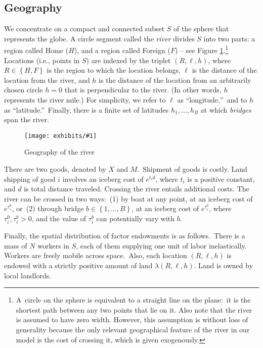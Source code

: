\documentclass[12pt]{article}
\newcommand{\dofigure}[2]{\begin{figure}[h!]
\center %
\texttt{[image: exhibits/\#1]}
\caption{#2\label{fig:#1}}
\end{figure}}
\begin{document}
\subsection{Geography}

We concentrate on a compact and connected subset $S$ of
the sphere that represents the globe. A circle segment called the \textit{%
river} divides $S$ into two parts: a region called Home ($H$), and a region called 
Foreign ($F$) -- see Figure \ref{fig:figurem1}.\footnote{%
A\ circle on the sphere is equivalent to a straight line on the plane:\ it
is the shortest path between any two points that lie on it. Also note that
the river is assumed to have zero width. However, this assumption is without
loss of generality because the only relevant geographical feature of the
river in our model is the cost of crossing it, which is given exogenously.}
Locations (i.e., points in $S$) are indexed by the triplet $\left( R,\ell
,h\right) $, where $R\in \left \{ H,F\right \} $ is the region to which the
location belongs, $\ell $ is the distance of the location from the river,
and $h$ is the distance of the location from an arbitrarily chosen circle $%
h=0$ that is perpendicular to the river. (In other words, $h$ represents the river mile.) For simplicity, we refer to $\ell $
as \textquotedblleft longitude,\textquotedblright \ and to $h$ as
\textquotedblleft latitude.\textquotedblright \ Finally, there is a finite
set of latitudes $h_{1},\ldots ,h_{B}$ at which \textit{bridges} span the
river.

\dofigure{figurem1}{Geography of the river}

There are two goods, denoted by $X$ and $M$.\ Shipment of goods is costly.
Land shipping of good $i$ involves an iceberg cost of $e^{t_{i}d}$, where $%
t_{i}$ is a positive constant, and $d$ is total distance traveled. Crossing
the river entails additional costs. The river can be crossed in two ways:\
(1) by boat at any point, at an iceberg cost of $e^{\tau _{i}^{0}}$, or\ (2)
through bridge $b\in \left \{ 1,\ldots ,B\right \} $, at an iceberg cost of $%
e^{\tau _{i}^{b}}$, where $\tau _{i}^{0},\tau _{i}^{b}>0$, and the value of $%
\tau _{i}^{b}$ can potentially vary with $b$.

Finally, the spatial distribution of factor endowments is as follows.\ There
is a mass of $N$ workers in $S$, each of them supplying one unit
of labor inelastically. Workers are freely mobile across space.\ Also, each location $\left(
R,\ell ,h\right) $ is endowed with a strictly positive amount of land $%
\lambda \left( R,\ell ,h\right) $. Land is owned by local landlords.
\end{document}
